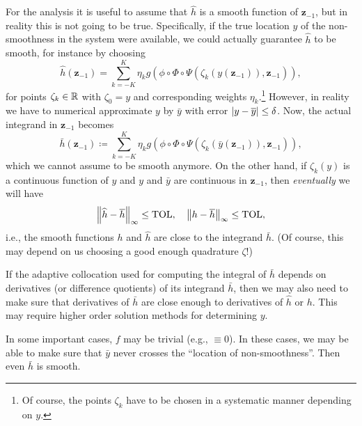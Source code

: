 \documentclass[11pt]{article}
\begin{document}
For the analysis it is useful to assume that $\hat{h}$ is a smooth function of $\mathbf{z}_{-1}$, but in reality this is not going to be true. Specifically, if the true location $y$ of the non-smoothness in the system were available, we could actually guarantee $\hat{h}$ to be smooth, for instance by choosing 
\begin{equation*}
	\hat{h}(\mathbf{z}_{-1}) = \sum_{k=-K}^{K} \eta_k g\left( \phi \circ \Phi \circ \Psi\left( \zeta_k(y(\mathbf{z}_{-1})),
	\mathbf{z}_{-1} \right) \right),
\end{equation*}
for points $\zeta_k \in \mathbb{R}$ with $\zeta_0 = y$ and corresponding weights
$\eta_k$.\footnote{Of course, the points $\zeta_k$ have to be chosen in a
	systematic manner depending on $y$.} However, in reality we have to
numerical approximate $y$ by $\bar{y}$ with error
$\left\lvert y - \overline{y}\right\rvert \le \delta$. Now, the actual integrand in $\mathbf{z}_{-1}$ becomes 
\begin{equation*}
	\bar{h}(\mathbf{z}_{-1}) \coloneqq \sum_{k=-K}^{K} \eta_k g\left( \phi \circ \Phi \circ \Psi\left( \zeta_k(
	\bar{y}(\mathbf{z}_{-1})), \mathbf{z}_{-1} \right) \right),
\end{equation*}
which we cannot assume to be smooth anymore. On the other hand, if
$\zeta_k(y)$ is a continuous function of $y$ and $y$ and $\bar{y}$ are continuous in $\mathbf{z}_{-1}$, then \emph{eventually} we will have
\begin{equation*}
	\left\lVert\widehat{h} - \overline{h}\right\rVert_\infty \le \mathrm{TOL}, \quad \left\lVert h - \overline{h}\right\rVert_\infty
	\le \mathrm{TOL}, 
\end{equation*}
i.e., the smooth functions $h$ and $\hat{h}$ are close to the integrand $\bar{h}$. (Of course, this may depend on us choosing a good enough quadrature
$\zeta$!) 
\begin{remark}
	If the adaptive collocation used for computing the integral of $\bar{h}$
	depends on derivatives (or difference quotients) of its integrand $\bar{h}$,
	then we may also need to make sure that derivatives of $\bar{h}$ are close
	enough to derivatives of $\hat{h}$ or $h$. This may require higher order
	solution methods for determining $y$.
\end{remark}
\begin{remark}
	In some important cases, $f$ may be trivial (e.g., $\equiv 0$). In these
	cases, we may be able to make sure that $\bar{y}$ never crosses the ``location of
	non-smoothness''. Then even $\bar{h}$ is smooth.
\end{remark}
\end{document}
